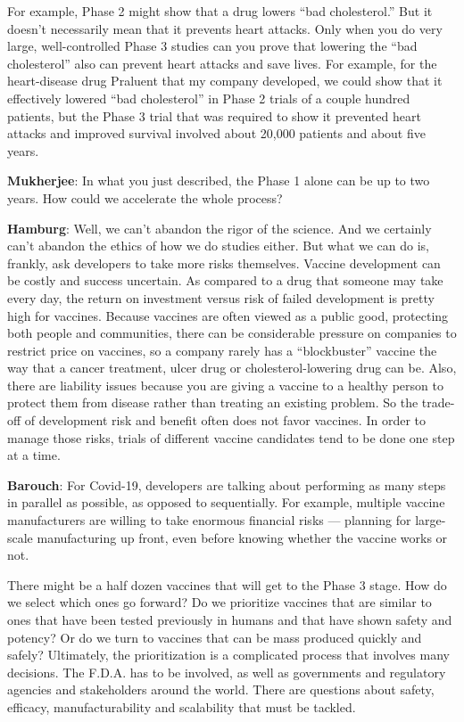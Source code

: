 For example, Phase 2 might show that a drug lowers ``bad cholesterol.''
But it doesn't necessarily mean that it prevents heart attacks. Only
when you do very large, well-controlled Phase 3 studies can you prove
that lowering the ``bad cholesterol'' also can prevent heart attacks and
save lives. For example, for the heart-disease drug Praluent that my
company developed, we could show that it effectively lowered ``bad
cholesterol'' in Phase 2 trials of a couple hundred patients, but the
Phase 3 trial that was required to show it prevented heart attacks and
improved survival involved about 20,000 patients and about five years.

\textbf{Mukherjee}: In what you just described, the Phase 1 alone can be
up to two years. How could we accelerate the whole process?

\textbf{Hamburg}: Well, we can't abandon the rigor of the science. And
we certainly can't abandon the ethics of how we do studies either. But
what we can do is, frankly, ask developers to take more risks
themselves. Vaccine development can be costly and success uncertain. As
compared to a drug that someone may take every day, the return on
investment versus risk of failed development is pretty high for
vaccines. Because vaccines are often viewed as a public good, protecting
both people and communities, there can be considerable pressure on
companies to restrict price on vaccines, so a company rarely has a
``blockbuster'' vaccine the way that a cancer treatment, ulcer drug or
cholesterol-lowering drug can be. Also, there are liability issues
because you are giving a vaccine to a healthy person to protect them
from disease rather than treating an existing problem. So the trade-off
of development risk and benefit often does not favor vaccines. In order
to manage those risks, trials of different vaccine candidates tend to be
done one step at a time.

\textbf{Barouch}: For Covid-19, developers are talking about performing
as many steps in parallel as possible, as opposed to sequentially. For
example, multiple vaccine manufacturers are willing to take enormous
financial risks --- planning for large-scale manufacturing up front,
even before knowing whether the vaccine works or not.

There might be a half dozen vaccines that will get to the Phase 3 stage.
How do we select which ones go forward? Do we prioritize vaccines that
are similar to ones that have been tested previously in humans and that
have shown safety and potency? Or do we turn to vaccines that can be
mass produced quickly and safely? Ultimately, the prioritization is a
complicated process that involves many decisions. The F.D.A. has to be
involved, as well as governments and regulatory agencies and
stakeholders around the world. There are questions about safety,
efficacy, manufacturability and scalability that must be tackled.

